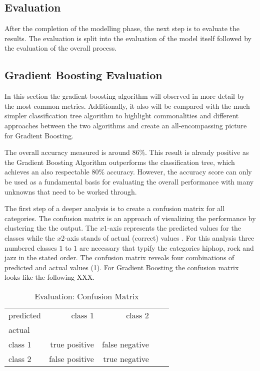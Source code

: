 \subsection{Evaluation}

After the completion of the modelling phase, the next step is to evaluate the results. The evaluation is split into 
the evaluation of the model itself followed by the evaluation of the overall process. 

\subsection{Gradient Boosting Evaluation}

In this section the gradient boosting algorithm will observed in more detail by the most common metrics. Additionally, it also
will be compared with the much simpler classification tree algorithm to highlight commonalities and different approaches between 
the two algorithms and create an all-encompassing picture for Gradient Boosting. 

The overall accuracy measured is around \(86\)\%. This result is already positive as the Gradient Boosting Algorithm outperforms 
the classification tree, which achieves an also respectable \(80\)\% accuracy. However, the accuracy score can only be used as a
fundamental basis for evaluating the overall performance with many unknowns that need to be worked through.

The first step of a deeper analysis is to create a confusion matrix for all categories. The confusion matrix is an approach of 
visualizing the performance by clustering the the output. The \(x1\)-axis represents the predicted values for the classes 
while the \(x2\)-axis stands of actual (correct) values \cite[p.235]{Davis_2006}. For this analysis three numbered classes \(1\) to \(1\) are necessary that 
typify the categories hiphop, rock and jazz in the stated order. The confusion matrix reveals four combinations of predicted 
and actual values (1). For Gradient Boosting the confusion matrix looks like the following XXX.

\begin{table}[H]
  \centering
  \begin{tabular}{lrrrr}
    \toprule
    predicted & class 1         &  class 2          \\
    actual    &                 &                   \\
    \midrule
    class 1   &  true positive  &  false negative   \\
    class 2   &  false positive &  true negative    \\
    \bottomrule
    \end{tabular}
  \caption{Evaluation: Confusion Matrix}%
  \label{tbl:evaluation_confusion_matrix}%
\end{table} 

